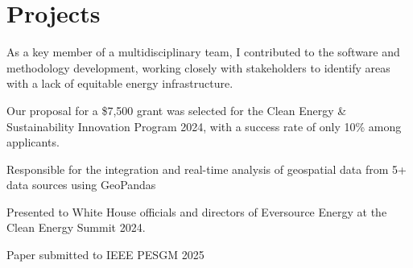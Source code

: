 \documentclass[]{resume-template}
\begin{document}
\begin{minipage}[t]{0.66\textwidth}
  \section{Projects}\label{sec:projects}
  \label{subsec:exo-eda}
  \begin{tightemize}
  \item As a key member of a multidisciplinary team, I contributed to the software and methodology development, working closely with stakeholders to identify areas with a lack of equitable energy infrastructure.
  \item Our proposal for a \$7,500 grant was selected for the Clean Energy \& Sustainability Innovation Program 2024, with a success rate of only 10\% among applicants.
  \item Responsible for the integration and real-time analysis of geospatial data from 5+ data sources using GeoPandas
  \item Presented to White House officials and directors of Eversource Energy at the Clean Energy Summit 2024.
  \item Paper submitted to IEEE PESGM 2025
  \end{tightemize}

\end{minipage}
\end{document}
